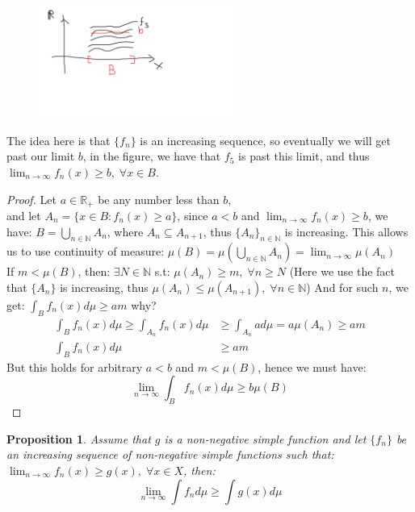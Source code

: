 \documentclass{article}
\newcommand{\R}{\mathbb{R}}
\newcommand{\N}{\mathbb{N}}
\newtheorem{prop}{Proposition}
\newtheorem{proof}{Proof}
\begin{document}
\newpage
\begin{figure}[h]
\includegraphics[width=6.5cm]{Lemma about limits and sequences of simple functions.png}
\centering
\end{figure}

The idea here is that $\{f_{n}\}$ is an increasing sequence, so eventually we will get past our limit $b$, in the figure, we have that $f_{5}$ is past this limit, and thus $\lim_{n\to \infty}f_{n}(x) \geq b, \; \forall x\in B$. 

\begin{proof}
Let $a\in \R_{+}$ be any number less than $b$, \\ 
and let $A_{n} = \{x\in B: f_{n}(x) \geq a\}$, since $a<b$ and $\lim_{n\to \infty}f_{n}(x) \geq b$, we have: $B = \bigcup_{n\in \N}A_{n}$, where $A_{n} \subseteq A_{n+1}$, thus $\{A_{n}\}_{n\in \N}$ is increasing. This allows us to use continuity of measure: 
$\mu(B) = \mu\left(\bigcup_{n\in \N}A_{n}\right) = \lim_{n\to \infty}\mu(A_{n})$ \\
If $m < \mu(B)$, then: $\exists N\in \N$ s.t: $\mu(A_{n}) \geq m, \; \forall n\geq N$ (Here we use the fact that $\{A_{n}\}$ is increasing, thus $\mu(A_{n}) \leq \mu(A_{n+1}), \; \forall n\in \N$) And for such $n$, we get: $\int_{B} f_{n}(x)d\mu \geq am$ why? \\ 
\begin{align*}
 \int_{B}f_{n}(x)d\mu \geq \int_{A_{n}}f_{n}(x)d\mu &\geq \int_{A_{n}} ad\mu
= a \mu(A_{n}) \geq am \\ 
\int_{B}f_{n}(x)d\mu &\geq am
\end{align*}
But this holds for arbitrary $a<b$ and $m<\mu(B)$, hence we must have: 
\[\lim_{n\to \infty}\int_{B}f_{n}(x)d\mu \geq b\mu(B)
\]
\end{proof}

\begin{prop}
Assume that $g$ is a non-negative simple function and let $\{f_{n}\}$ be an increasing sequence of non-negative simple functions such that: $\lim_{n\to \infty}f_{n}(x) \geq g(x), \; \forall x\in X$, then: 
\[\lim_{n\to \infty}\int f_{n}d\mu \geq \int g(x)d\mu
\]
\end{prop}
\end{document}
